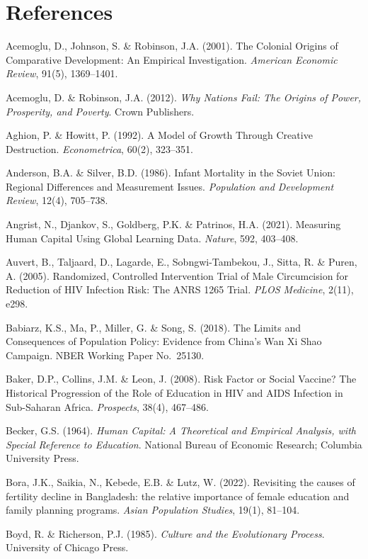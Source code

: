 \documentclass[12pt,letterpaper]{article}
\begin{document}
\section*{References}\label{references}


Acemoglu, D., Johnson, S. \& Robinson, J.A. (2001). The Colonial Origins of Comparative Development: An Empirical Investigation. \emph{American Economic Review}, 91(5), 1369--1401.

Acemoglu, D. \& Robinson, J.A. (2012). \emph{Why Nations Fail: The
Origins of Power, Prosperity, and Poverty}. Crown Publishers.

Aghion, P. \& Howitt, P. (1992). A Model of Growth Through Creative
Destruction. \emph{Econometrica}, 60(2), 323--351.

Anderson, B.A. \& Silver, B.D. (1986). Infant Mortality in the Soviet
Union: Regional Differences and Measurement Issues. \emph{Population
and Development Review}, 12(4), 705--738.

Angrist, N., Djankov, S., Goldberg, P.K. \& Patrinos, H.A. (2021).
Measuring Human Capital Using Global Learning Data. \emph{Nature}, 592,
403--408.

Auvert, B., Taljaard, D., Lagarde, E., Sobngwi-Tambekou, J., Sitta, R.
\& Puren, A. (2005). Randomized, Controlled Intervention Trial of Male
Circumcision for Reduction of HIV Infection Risk: The ANRS 1265 Trial.
\emph{PLOS Medicine}, 2(11), e298.

Babiarz, K.S., Ma, P., Miller, G. \& Song, S. (2018). The Limits and
Consequences of Population Policy: Evidence from China's Wan Xi Shao
Campaign. NBER Working Paper No.~25130.

Baker, D.P., Collins, J.M. \& Leon, J. (2008). Risk Factor or Social
Vaccine? The Historical Progression of the Role of Education in HIV and
AIDS Infection in Sub-Saharan Africa. \emph{Prospects}, 38(4), 467--486.

Becker, G.S. (1964). \emph{Human Capital: A Theoretical and Empirical
Analysis, with Special Reference to Education}. National Bureau of
Economic Research; Columbia University Press.

Bora, J.K., Saikia, N., Kebede, E.B. \& Lutz, W. (2022). Revisiting
the causes of fertility decline in Bangladesh: the relative importance
of female education and family planning programs. \emph{Asian Population
Studies}, 19(1), 81--104.

Boyd, R. \& Richerson, P.J. (1985). \emph{Culture and the Evolutionary
Process}. University of Chicago Press.
\end{document}
